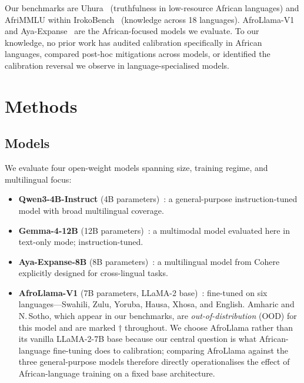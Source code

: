 \documentclass[11pt,a4paper]{article}
\begin{document}
Our benchmarks are Uhura~\citep{bayes2024uhura} (truthfulness in low-resource
African languages) and AfriMMLU within IrokoBench~\citep{adelani2024irokobench}
(knowledge across 18 languages). AfroLlama-V1~\citep{dossou2024afrollama} and
Aya-Expanse~\citep{aryabumi2024aya} are the African-focused models we evaluate.
To our knowledge, no prior work has audited calibration specifically in African
languages, compared post-hoc mitigations across models, or identified the
calibration reversal we observe in language-specialised models.

\section{Methods}
\label{sec:methods}

\subsection{Models}

We evaluate four open-weight models spanning size, training regime, and
multilingual focus:

\begin{itemize}[leftmargin=1.5em,itemsep=3pt]
  \item \textbf{Qwen3-4B-Instruct} (4B parameters)~\citep{qwen3team2025}: a
    general-purpose instruction-tuned model with broad multilingual coverage.
  \item \textbf{Gemma-4-12B} (12B parameters)~\citep{gemmateam2024}: a
    multimodal model evaluated here in text-only mode; instruction-tuned.
  \item \textbf{Aya-Expanse-8B} (8B parameters)~\citep{aryabumi2024aya}: a
    multilingual model from Cohere explicitly designed for cross-lingual tasks.
  \item \textbf{AfroLlama-V1} (7B parameters, LLaMA-2 base)~\citep{dossou2024afrollama}:
    fine-tuned on six languages---Swahili, Zulu, Yoruba, Hausa, Xhosa, and
    English. Amharic and N.\,Sotho, which appear in our benchmarks, are
    \emph{out-of-distribution} (OOD) for this model and are marked $\dagger$
    throughout. We choose AfroLlama rather than its vanilla LLaMA-2-7B base
    because our central question is what African-language fine-tuning does to
    calibration; comparing AfroLlama against the three general-purpose models
    therefore directly operationalises the effect of African-language training
    on a fixed base architecture.
\end{itemize}
\end{document}

